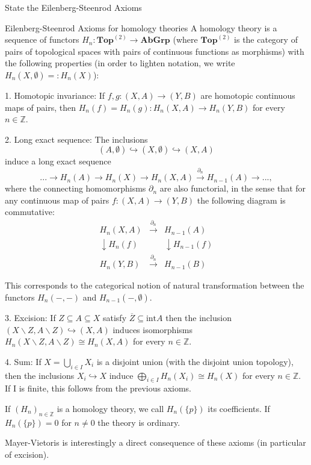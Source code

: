 State the Eilenberg-Steenrod Axioms

Eilenberg-Steenrod Axioms for homology theories
A homology theory is a sequence of functors \(H_n \colon \textbf{Top}^{(2)} \to \textbf{AbGrp}\) 
(where \(\textbf{Top}^{(2)}\) is the category of pairs of topological spaces with pairs of continuous functions as morphisms)
with the following properties (in order to lighten notation, we write \(H_n(X, \emptyset) =: H_n(X)\)): 

1. Homotopic invariance: 
If \(f, g \colon (X, A) \to (Y, B)\) are homotopic continuous maps of pairs, 
then \(H_n(f) = H_n(g) \colon H_n(X, A) \to H_n(Y, B)\) for every \(n \in \mathbb{Z}\).

2. Long exact sequence: 
The inclusions 
\[
(A, \emptyset) \hookrightarrow (X, \emptyset) \hookrightarrow (X, A)
\] 
induce a long exact sequence
\[
... \longrightarrow H_n(A) \longrightarrow H_n(X) \longrightarrow H_n(X, A) \xrightarrow{\partial_n} H_{n-1}(A) \longrightarrow ... ,
\]
where the connecting homomorphisms \(\partial_n\) are also functorial, 
in the sense that for any continuous map of pairs \(f \colon (X, A) \to (Y, B)\) 
the following diagram is commutative:
\[
\begin{array}{ccc}
H_n(X, A) & \xrightarrow{\partial_n} & H_{n-1}(A) \\
\downarrow H_n(f) & & \downarrow H_{n-1}(f) \\
H_n(Y, B) & \xrightarrow{\partial_n} & H_{n-1}(B)
\end{array}
\]

This corresponds to the categorical notion of natural transformation between the functors \(H_n(-, -)\) and \(H_{n-1}(-, \emptyset)\).

3. Excision: 
If \(Z \subseteq A \subseteq X\) satisfy \(\overline{Z} \subseteq \text{int} A\) then the inclusion 
\((X \backslash Z, A \backslash Z) \hookrightarrow (X, A)\) induces isomorphisms 
\(H_n(X \backslash Z, A \backslash Z) \cong H_n(X, A)\) for every \(n \in \mathbb{Z}\).

4. Sum: If \(X = \bigcup_{i \in I} X_i\) is a disjoint union (with the disjoint union topology), 
then the inclusions \(X_i \hookrightarrow X\) induce \(\bigoplus_{i \in I} H_n(X_i) \cong H_n(X)\) 
for every \(n \in \mathbb{Z}\). If I is finite, this follows from the previous axioms.

If \((H_n)_{n \in \mathbb{Z}}\) is a homology theory, we call \(H_n(\{p\})\) its coefficients.
If \(H_n(\{p\}) = 0\) for \(n \neq 0\) the theory is ordinary. 

Mayer-Vietoris is interestingly a direct consequence of these axioms (in particular of excision).


